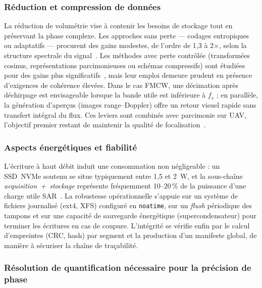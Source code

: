 \subsubsection{Réduction et compression de données}

La réduction de volumétrie vise à contenir les besoins de stockage tout en préservant la phase complexe. Les approches sans perte — codages entropiques ou adaptatifs — procurent des gains modestes, de l’ordre de 1{,}3 à 2$\times$, selon la structure spectrale du signal~\cite{Pieterse2019_SARcompressionMetrics}. Les méthodes avec perte contrôlée (transformées cosinus, représentations parcimonieuses ou schémas compressifs) sont étudiées pour des gains plus significatifs~\cite{Choi2021_DroneSARcompression, Kim2025_SARcompressionPointClouds}, mais leur emploi demeure prudent en présence d’exigences de cohérence élevées. Dans le cas FMCW, une décimation après déchirpage est envisageable lorsque la bande utile est inférieure à $f_s$ ; en parallèle, la génération d’aperçus (images range–Doppler) offre un retour visuel rapide sans transfert intégral du flux. Ces leviers sont combinés avec parcimonie sur UAV, l’objectif premier restant de maintenir la qualité de focalisation~\cite{Svedin2021_UAVSAR}.

\subsubsection{Aspects énergétiques et fiabilité}

L’écriture à haut débit induit une consommation non négligeable : un SSD~NVMe soutenu se situe typiquement entre 1{,}5 et 2~W, et la sous-chaîne \textit{acquisition~+~stockage} représente fréquemment 10–20\,\% de la puissance d’une charge utile SAR~\cite{Sun2020_PassiveUAVSAR}. La robustesse opérationnelle s’appuie sur un système de fichiers journalisé (ext4, XFS) configuré en \texttt{noatime}, sur un \textit{flush} périodique des tampons et sur une capacité de sauvegarde énergétique (supercondensateur) pour terminer les écritures en cas de coupure. L’intégrité se vérifie enfin par le calcul d’empreintes (CRC, hash) par segment et la production d’un manifeste global, de manière à sécuriser la chaîne de traçabilité.

\subsubsection{Résolution de quantification nécessaire pour la précision de phase}

